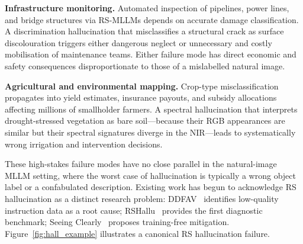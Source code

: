 \textbf{Infrastructure monitoring.}
Automated inspection of pipelines, power lines, and bridge structures via
RS-MLLMs depends on accurate damage classification. A discrimination
hallucination that misclassifies a structural crack as surface discolouration
triggers either dangerous neglect or unnecessary and costly mobilisation of
maintenance teams. Either failure mode has direct economic and safety
consequences disproportionate to those of a mislabelled natural image.

\textbf{Agricultural and environmental mapping.}
Crop-type misclassification propagates into yield estimates, insurance payouts,
and subsidy allocations affecting millions of smallholder farmers. A spectral
hallucination that interprets drought-stressed vegetation as bare soil---because
their RGB appearances are similar but their spectral signatures diverge in
the NIR---leads to systematically wrong irrigation and intervention decisions.

These high-stakes failure modes have no close parallel in the natural-image
MLLM setting, where the worst case of hallucination is typically a wrong
object label or a confabulated description. Existing work has begun to
acknowledge RS hallucination as a distinct research problem:
DDFAV~\cite{ddfav2025} identifies low-quality instruction data as a root
cause; RSHallu~\cite{rshallu2026} provides the first diagnostic benchmark;
Seeing Clearly~\cite{seeingclearly2026} proposes training-free mitigation.
Figure~\ref{fig:hall_example} illustrates a canonical RS hallucination failure.

